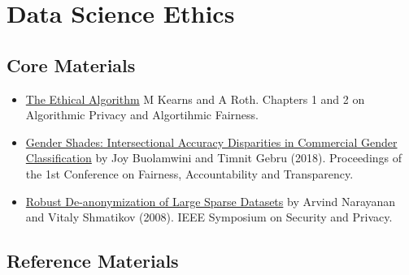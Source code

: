 \documentclass[
  letterpaper,
  DIV=11,
  numbers=noendperiod]{scrreprt}
\begin{document}
\section{Data Science Ethics}\label{data-science-ethics-1}

\subsection*{Core Materials}\label{core-materials-4}

\begin{itemize}
\item
  \href{https://library-search.imperial.ac.uk/discovery/fulldisplay?docid=alma991000531083101591&context=L&vid=44IMP_INST:ICL_VU1&lang=en&search_scope=MyInst_and_CI&adaptor=Local\%20Search\%20Engine&tab=Everything&query=any,contains,kearns\%20and\%20roth&mode=Basic}{The
  Ethical Algorithm} M Kearns and A Roth. Chapters 1 and 2 on
  Algorithmic Privacy and Algortihmic Fairness.
\item
  \href{https://proceedings.mlr.press/v81/buolamwini18a.html}{Gender
  Shades: Intersectional Accuracy Disparities in Commercial Gender
  Classification} by Joy Buolamwini and Timnit Gebru (2018). Proceedings
  of the 1st Conference on Fairness, Accountability and Transparency.
\item
  \href{https://ieeexplore.ieee.org/document/4531148}{Robust
  De-anonymization of Large Sparse Datasets} by Arvind Narayanan and
  Vitaly Shmatikov (2008). IEEE Symposium on Security and Privacy.
\end{itemize}

\subsection*{Reference Materials}\label{reference-materials-3}
\end{document}
